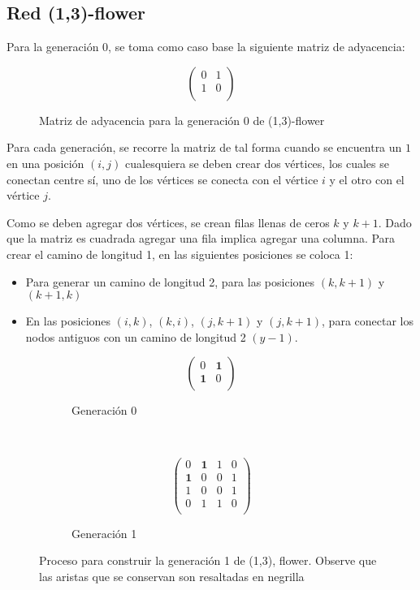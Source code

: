 \subsection{Red (1,3)-flower}

Para la generación 0, se toma como caso base la siguiente matriz de adyacencia:

\begin{figure}[H]
    \centering
\[ 
\left( \begin{array}{cc}
 0 & 1  \\ 
 1 & 0 \\
\end{array} \right)\]
\caption{Matriz de adyacencia para la generación 0 de (1,3)-flower}
\end{figure}

Para cada generación, se recorre la matriz de tal forma cuando se encuentra un $1$ en una posición $(i,j)$ cualesquiera se deben crear dos vértices, los cuales se conectan centre sí, uno de los vértices se conecta con el vértice $i$ y el otro con el vértice $j$. 

Como se deben agregar dos vértices, se crean filas llenas de ceros $k$ y $k+1$. Dado que la matriz es cuadrada agregar una fila implica agregar una columna. Para crear el camino de longitud 1, en las siguientes posiciones se coloca 1:

\begin{itemize}
    \item Para generar un camino de longitud 2, para las posiciones $(k,k+1)$ y $(k+1,k)$ 
    \item En las posiciones $(i,k)$, $(k,i)$, $(j,k+1)$ y $(j,k+1)$, para conectar los nodos antiguos con un camino de longitud 2 $(y-1)$.
\end{itemize}

\begin{figure}[H]
    \centering
     \begin{subfigure}[b]{0.25\textwidth}
\[ 
\left( \begin{array}{cc}
 0 & \textbf{1}  \\ 
\textbf{1} & 0 \\
\end{array} \right)\]
\caption{Generación 0}
 \end{subfigure}~ \begin{subfigure}[b]{0.25\textwidth}
 \[ \left( \begin{array}{cccc}
 0 & \textbf{1} & 1 & 0  \\ 
 \textbf{1} & 0 & 0 & 1\\
 1 & 0 & 0 & 1 \\
 0 & 1 & 1 & 0\\
\end{array} \right)\]
\caption{Generación 1}
     \end{subfigure}
    \caption{Proceso para construir la generación 1 de (1,3), flower. Observe que las aristas que se conservan son resaltadas en negrilla}
    \label{fig:redesfractales}
\end{figure}

